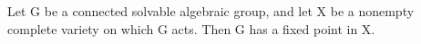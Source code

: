 Let G be a connected solvable algebraic group, and let X be a nonempty complete variety on which G acts. Then G has a fixed point in X.
